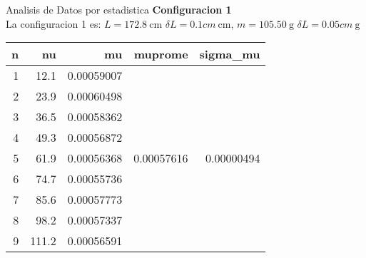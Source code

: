 \documentclass{article}
\begin{document}


Analisis de Datos por estadistica 
\textbf{Configuracion 1}\\
La configuracion 1 es: $L=172.8\ \text{cm}$ $\delta L = 0.1 cm\ \text{cm}$, $m = 105.50 \ \text{g}$ $\delta L = 0.05 cm\ \text{g}$ 

\begin{table}[ht]
\centering
\begin{tabular}{rrrrr}
  \hline
n & nu & mu & muprome & sigma\_mu \\ 
  \hline
1 & 12.1 & 0.00059007 &  &  \\ 
  2 & 23.9 & 0.00060498 &  &  \\ 
  3 & 36.5 & 0.00058362 &  &  \\ 
  4 & 49.3 & 0.00056872 &  &  \\ 
  5 & 61.9 & 0.00056368 & 0.00057616 & 0.00000494 \\ 
  6 & 74.7 & 0.00055736 &  &  \\ 
  7 & 85.6 & 0.00057773 &  &  \\ 
  8 & 98.2 & 0.00057337 &  &  \\ 
  9 & 111.2 & 0.00056591 &  &  \\ 
   \hline
\end{tabular}
\end{table}
\end{document}

